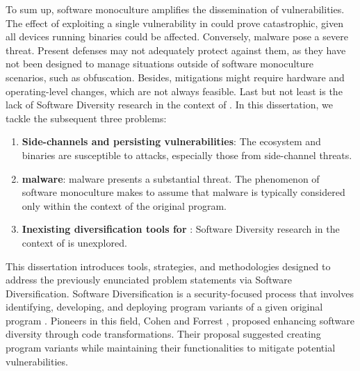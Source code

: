
To sum up, software monoculture amplifies the dissemination of vulnerabilities. 
The effect of exploiting a single vulnerability in \Wasm could prove catastrophic, given all devices running \Wasm binaries could be affected. 
Conversely, \Wasm malware pose a severe threat. 
Present defenses may not adequately protect against them, as they have not been designed to manage situations outside of software monoculture scenarios, such as obfuscation. 
Besides, mitigations might require hardware and operating-level changes, which are not always feasible.
Last but not least is the lack of Software Diversity research in the context of \Wasm.
In this dissertation, we tackle the subsequent three problems:

\begin{enumerate}[label=\textbf{P\arabic*}, ref=\textbf{P\arabic*}]

	\item \label{prob4} \textbf{Side-channels and persisting vulnerabilities}: The \Wasm ecosystem and binaries are susceptible to attacks, especially those from side-channel threats.
	
	\item \label{prob5} \textbf{\Wasm malware}: 
	\Wasm malware presents a substantial threat. 
	The phenomenon of software monoculture makes to assume that malware is typically considered only within the context of the original program.

	
	\item \label{prob6} \textbf{Inexisting diversification tools for \Wasm}:
	Software Diversity research in the context of \Wasm is unexplored.

\end{enumerate}


\begin{comment}
\msection{Problem statement}

\end{comment}


This dissertation introduces tools, strategies, and methodologies designed to address the previously enunciated problem statements via Software Diversification.
Software Diversification is a security-focused process that involves identifying, developing, and deploying program variants of a given original program \cite{okhravi2013survey}.
Pioneers in this field, Cohen \etal \cite{cohen1993operating} and Forrest \etal \cite{595185}, proposed enhancing software diversity through code transformations. 
Their proposal suggested creating program variants while maintaining their functionalities to mitigate potential vulnerabilities.




